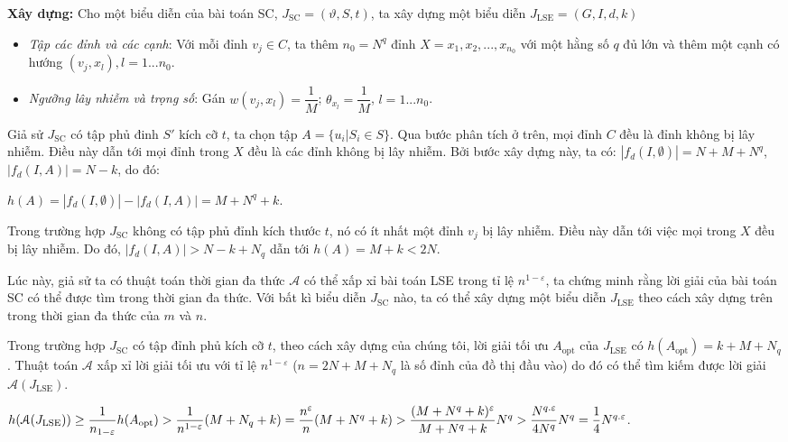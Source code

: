  	{\bfseries Xây dựng:} Cho một biểu diễn của bài toán SC, $J_{\text{SC}} = (\vartheta, S, t)$, ta xây dựng một biểu diễn $J_{\text{LSE}} = (G, I, d, k)$ 
 	\begin {itemize}
 	\item {\itshape Tập các đỉnh và các cạnh}: Với mỗi đỉnh $v_{j} \in C$, ta thêm $n_{0} = N^{q}$ đỉnh $X = { x_{1}, x_{2}, ... , x_{n_{0}}}$ với một hằng số $q$ đủ lớn và thêm một cạnh có hướng $(v_{j}, x_{l}), l = 1 ... n_{0}$.
 	
 	\item {\itshape Ngưỡng lây nhiễm và trọng số}: Gán $w(v_{j}, x_{l}) = \dfrac{1}{M}$; $\theta_{x_{l}} = \dfrac{1}{M}$, $l = 1 ... n_{0}$.\\
 	\end {itemize}
 	Giả sử $J_{\text{SC}}$ có tập phủ đinh $S'$ kích cỡ $t$, ta chọn tập $A = \{{u_{i} | S_{i} \in S}\}$. Qua bước phân tích ở trên, mọi đỉnh $C$ đều là đỉnh không bị lây nhiễm. Điều này dẫn tới mọi đỉnh trong $X$ đều là các đỉnh không bị lây nhiễm. Bởi bước xây dựng này, ta có: $| f_{d}(I, \emptyset) | = N + M + N^{q}$, $| f_{d}(I, A) | = N - k$, do đó: 
 	\begin{center}
 		$h(A) = | f_{d}(I, \emptyset) | - | f_{d}(I, A) | = M + N^{q} + k$.
 	\end{center}
 	
 	Trong trường hợp $J_{\text{SC}}$ không có tập phủ đỉnh kích thước $t$, nó có ít nhất một đỉnh $v_{j}$ bị lây nhiễm. Điều này dẫn tới việc mọi trong $X$ đều bị lây nhiễm. Do đó, $| f_{d}(I, A) | > N - k + N_{q}$ dẫn tới $h(A) = M  + k < 2N$.
 	
 	Lúc này, giả sử ta có thuật toán thời gian đa thức $ \mathcal{A} $ có thể xấp xỉ bài toán LSE trong tỉ lệ $n^{1 - \varepsilon}$, ta chứng minh rằng lời giải của bài toán SC có thể được tìm trong thời gian đa thức. Với bất kì biểu diễn $J_{\text{SC}}$ nào, ta có thể xây dựng một biểu diễn $J_{\text{LSE}}$ theo cách xây dựng trên trong thời gian đa thức của $m$ và $n$. 
 	
 	Trong trường hợp $J_{\text{SC}}$ có tập đỉnh phủ kích cỡ $t$, theo cách xây dựng của chúng tôi, lời giải tối ưu $A_{\text{opt}}$ của $J_{\text{LSE}}$ có $h(A_{\text{opt}}) = k + M + N_{q}$. Thuật toán $\mathcal{A}$ xấp xỉ lời giải tối ưu với tỉ lệ $n^{1 - \varepsilon}$ ($n = 2N + M + N_{q}$ là số đỉnh của đồ thị đầu vào) do đó có thể tìm kiếm được lời giải $\mathcal{A}(J_{\text{LSE}})$. 
 	\begin{center}
 		$h(\mathcal{A}(J_{\text{LSE}})) \geq \dfrac{1}{n_{1 - \varepsilon}} h(A_{\text{opt}}) > \dfrac{1}{n^{1 - \varepsilon}}(M + N_{q} +k) = \dfrac{n^{\varepsilon}}{n}(M + N^{q} +k) \linebreak > \dfrac{(M + N^{q} + k)^{\varepsilon}}{M + N^{q} + k}N^{q}> \dfrac{N^{q.\varepsilon}}{4N^{q}}N^{q} = \dfrac{1}{4}N^{q.\varepsilon}$. 	
 	\end{center}
 	
